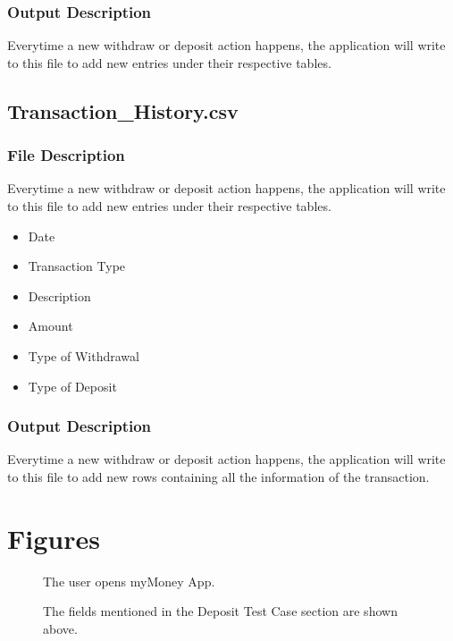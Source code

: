 \documentclass[12pt]{article}
\begin{document}
\subsubsection{Output Description}
Everytime a new withdraw or deposit action happens, the application will write to this file to add new entries under their respective tables.  

\subsection{Transaction\_History.csv}

\subsubsection{File Description}
Everytime a new withdraw or deposit action happens, the application will write to this file to add new entries under their respective tables.  
\begin{itemize}
  \item Date
  \item Transaction Type
  \item Description
  \item Amount
  \item Type of Withdrawal
  \item Type of Deposit
\end{itemize}

\subsubsection{Output Description}
Everytime a new withdraw or deposit action happens, the application will write to this file to add new rows containing all the information of the transaction.

\clearpage 
\section{Figures}

\begin{figure}[H]
  \caption{The user opens myMoney App.}
\end{figure}

\begin{figure}[H]
  \caption{The fields mentioned in the Deposit Test Case section are shown above.}
\end{figure}
\end{document}
